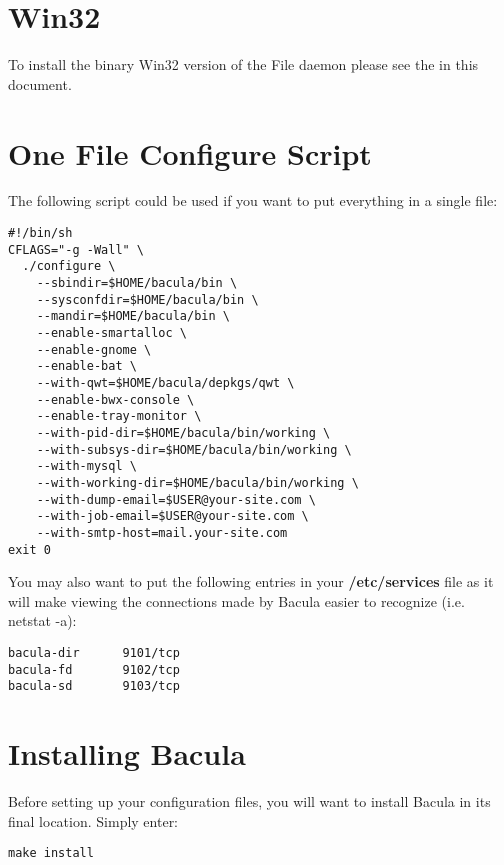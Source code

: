 \section{Win32}

To install the binary Win32 version of the File daemon please see the 
 in this document. 

\section{One File Configure Script}

The following script could be used if you want to put everything
in a single file:

\footnotesize
\begin{verbatim}
#!/bin/sh
CFLAGS="-g -Wall" \
  ./configure \
    --sbindir=$HOME/bacula/bin \
    --sysconfdir=$HOME/bacula/bin \
    --mandir=$HOME/bacula/bin \
    --enable-smartalloc \
    --enable-gnome \
    --enable-bat \
    --with-qwt=$HOME/bacula/depkgs/qwt \
    --enable-bwx-console \
    --enable-tray-monitor \
    --with-pid-dir=$HOME/bacula/bin/working \
    --with-subsys-dir=$HOME/bacula/bin/working \
    --with-mysql \
    --with-working-dir=$HOME/bacula/bin/working \
    --with-dump-email=$USER@your-site.com \
    --with-job-email=$USER@your-site.com \
    --with-smtp-host=mail.your-site.com
exit 0
\end{verbatim}
\normalsize

You may also want to put the following entries in your {\bf /etc/services}
file as it will make viewing the connections made by Bacula easier to
recognize (i.e. netstat -a): 

\footnotesize
\begin{verbatim}
bacula-dir      9101/tcp
bacula-fd       9102/tcp
bacula-sd       9103/tcp
\end{verbatim}
\normalsize

\section{Installing Bacula}

Before setting up your configuration files, you will want to install Bacula in
its final location. Simply enter: 

\footnotesize
\begin{verbatim}
make install
\end{verbatim}
\normalsize

